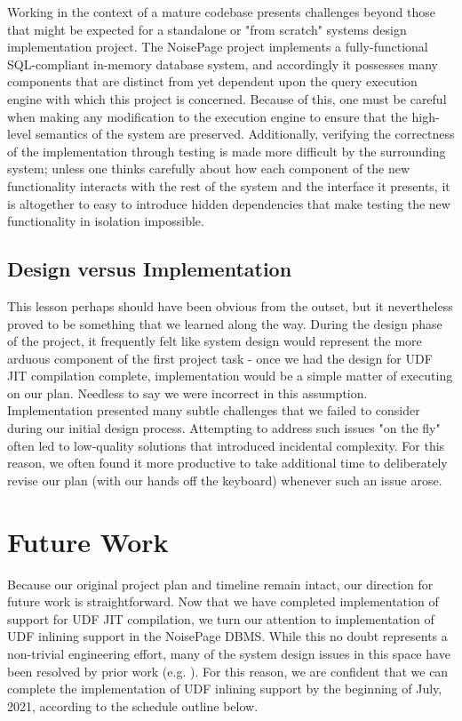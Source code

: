 \documentclass{vldb}
\begin{document}
Working in the context of a mature codebase presents challenges beyond those that might be expected for a standalone or "from scratch" systems design implementation project. The NoisePage project implements a fully-functional SQL-compliant in-memory database system, and accordingly it possesses many components that are distinct from yet dependent upon the query execution engine with which this project is concerned. Because of this, one must be careful when making any modification to the execution engine to ensure that the high-level semantics of the system are preserved. Additionally, verifying the correctness of the implementation through testing is made more difficult by the surrounding system; unless one thinks carefully about how each component of the new functionality interacts with the rest of the system and the interface it presents, it is altogether to easy to introduce hidden dependencies that make testing the new functionality in isolation impossible.

\subsection{Design versus Implementation}

This lesson perhaps should have been obvious from the outset, but it nevertheless proved to be something that we learned along the way. During the design phase of the project, it frequently felt like system design would represent the more arduous component of the first project task - once we had the design for UDF JIT compilation complete, implementation would be a simple matter of executing on our plan. Needless to say we were incorrect in this assumption. Implementation presented many subtle challenges that we failed to consider during our initial design process. Attempting to address such issues "on the fly" often led to low-quality solutions that introduced incidental complexity. For this reason, we often found it more productive to take additional time to deliberately revise our plan (with our hands off the keyboard) whenever such an issue arose.


\section{Future Work}

Because our original project plan and timeline remain intact, our direction for future work is straightforward. Now that we have completed implementation of support for UDF JIT compilation, we turn our attention to implementation of UDF inlining support in the NoisePage DBMS. While this no doubt represents a non-trivial engineering effort, many of the system design issues in this space have been resolved by prior work (e.g. \cite{froid, apfel}). For this reason, we are confident that we can complete the implementation of UDF inlining support by the beginning of July, 2021, according to the schedule outline below.
\end{document}
